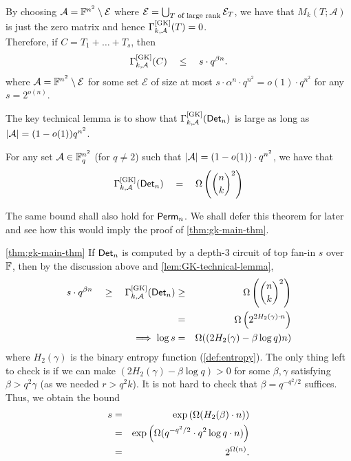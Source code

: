  By choosing $\mathcal{A} = \mathbb{F}^{n^2} \setminus \mathcal{E}$ where
 $\mathcal{E} = \bigcup_{\text{$T$ of large rank}} \mathcal{E}_T$, we
 have that $M_k(T;\mathcal{A})$ is just the zero matrix and hence
 $\Gamma^{\mathrm{[GK]}}_{k,\mathcal{A}}(T) = 0$.\\


Therefore, if $C = T_1 + \dots + T_s$, then 
\begin{equation}\label{eqn:gk-upper-bound-circuit}
\Gamma^{\mathrm{[GK]}}_{k,\mathcal{A}}(C) \quad \leq \quad s \cdot
q^{\beta n}.
\end{equation} 
where $\mathcal{A} = \mathbb{F}^{n^2} \setminus \mathcal{E}$ for some set
$\mathcal{E}$ of size at most $s \cdot \alpha^n \cdot q^{n^2} = o(1) \cdot q^{n^2}$ for any $s = 2^{o(n)}$.

The key technical lemma is to show that
$\Gamma^{\mathrm{[GK]}}_{k,\mathcal{A}}(\mathsf{Det}_n)$ is large as long as
$\left|\mathcal{A}\right| = (1 - o(1)) q^{n^2}$.

\begin{lemma}\label{lem:GK-technical-lemma}
  For any set $\mathcal{A} \in \mathbb{F}_q^{n^2}$ (for $q\neq 2$) such that
  $\left|\mathcal{A}\right| = (1 - o(1)) \cdot q^{n^2}$, we have that
\[
\Gamma^{\mathrm{[GK]}}_{k,\mathcal{A}}(\mathsf{Det}_n) \quad = \quad \Omega\left(\binom{n}{k}^2\right)
\]
\end{lemma}

The same bound shall also hold for $\mathsf{Perm}_n$. We shall defer this
theorem for later and see how this would imply the proof of
\autoref{thm:gk-main-thm}.

\begin{proofof}{\autoref{thm:gk-main-thm}}
  If $\mathsf{Det}_n$ is computed by a depth-3 circuit of top fan-in $s$ over
  $\mathbb{F}$, then by the discussion above and
  \autoref{lem:GK-technical-lemma},
\begin{eqnarray*}
s \cdot q^{\beta n} \quad \geq \quad \Gamma^{\mathrm{[GK]}}_{k,\mathcal{A}}(\mathsf{Det}_n) & \geq &    \Omega\left(\binom{n}{k}^2\right)\\
 & = & \Omega\left(2^{2H_2(\gamma)\cdot n}\right)\\
\implies \log s & = & \Omega((2H_2(\gamma) - \beta \log q)n)
\end{eqnarray*}
where $H_2(\gamma)$ is the binary entropy function
(\autoref{def:entropy}). The only thing left to check is if we can
make $(2H_2(\gamma) - \beta \log q) > 0$ for some $\beta,\gamma$
satisfying $\beta > q^2 \gamma$ (as we needed $r > q^2 k$). It is not
hard to check that $\beta = q^{-q^2/2}$ suffices. Thus, we obtain the
bound
\begin{eqnarray*}
  s &=&  \exp\left(\Omega(H_2(\beta)\cdot n)\right) \\
    &=&  \exp\left(\Omega(q^{-q^2/2} \cdot q^2 \log q \cdot n)\right)\\
  & =& 2^{\Omega(n)}.
\end{eqnarray*}
\end{proofof}


